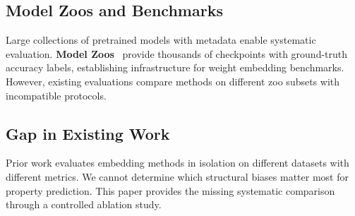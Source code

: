 \subsection{Model Zoos and Benchmarks}

Large collections of pretrained models with metadata enable systematic evaluation. \textbf{Model Zoos}~\cite{schurholt2022model} provide thousands of checkpoints with ground-truth accuracy labels, establishing infrastructure for weight embedding benchmarks. However, existing evaluations compare methods on different zoo subsets with incompatible protocols.

\subsection{Gap in Existing Work}

Prior work evaluates embedding methods in isolation on different datasets with different metrics. We cannot determine which structural biases matter most for property prediction. This paper provides the missing systematic comparison through a controlled ablation study.
